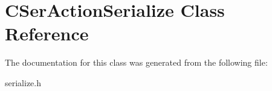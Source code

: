 \hypertarget{class_c_ser_action_serialize}{}\section{C\+Ser\+Action\+Serialize Class Reference}
\label{class_c_ser_action_serialize}


The documentation for this class was generated from the following file\+:\begin{DoxyCompactItemize}
\item 
serialize.\+h\end{DoxyCompactItemize}
